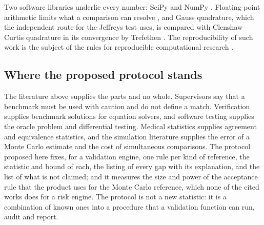 Two software libraries underlie every number: SciPy \citep{virtanen2020} and NumPy \citep{harris2020}. Floating-point arithmetic limits what a comparison can resolve \citep{goldberg1991,higham2002}, and Gauss quadrature, which the independent route for the Jeffreys test uses, is compared with Clenshaw--Curtis quadrature in its convergence by Trefethen \citep{trefethen2008}. The reproducibility of such work is the subject of the rules for reproducible computational research \citep{peng2011,sandve2013}.

\subsection{Where the proposed protocol stands}
\label{sec:rw-position}

The literature above supplies the parts and no whole. Supervisors say that a benchmark must be used with caution and do not define a match. Verification supplies benchmark solutions for equation solvers, and software testing supplies the oracle problem and differential testing. Medical statistics supplies agreement and equivalence statistics, and the simulation literature supplies the error of a Monte Carlo estimate and the cost of simultaneous comparisons. The protocol proposed here fixes, for a validation engine, one rule per kind of reference, the statistic and bound of each, the listing of every gap with its explanation, and the list of what is not claimed; and it measures the size and power of the acceptance rule that the product uses for the Monte Carlo reference, which none of the cited works does for a risk engine. The protocol is not a new statistic: it is a combination of known ones into a procedure that a validation function can run, audit and report.
